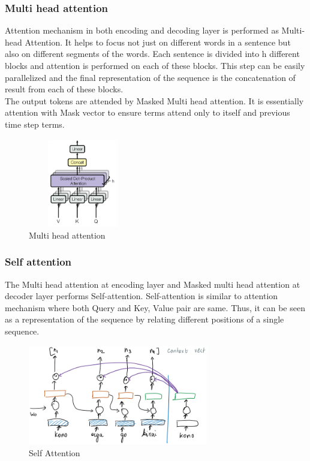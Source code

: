 \subsubsection{Multi head attention}
Attention mechanism in both encoding and decoding layer is performed as Multi-head Attention. It helps to focus not just on different words in a sentence but also on different segments of the words. Each sentence is divided into h different blocks and attention is performed on each of these blocks. This step can be easily parallelized and the final representation of the sequence is the concatenation of result from each of these blocks.  \\
The output tokens are attended by Masked Multi head attention. It is essentially attention with Mask vector to ensure terms attend only to itself and previous time step terms. 

\begin{figure}[H]
\centering
\includegraphics[width=0.4\textwidth]{images/mutlihead.png}
\caption{Multi head attention}
\label{fig:multihead}
\end{figure} 

\subsubsection{Self attention}
The Multi head attention at encoding layer and Masked multi head attention at decoder layer performs Self-attention. Self-attention is similar to attention mechanism where both Query and Key, Value pair are same. Thus, it can be seen as a representation of the sequence by relating different positions of a single sequence.
\begin{figure}[H]
\centering
\includegraphics[width=0.7\textwidth]{images/selfattn.png}
\caption{Self Attention}
\label{fig:selfattn}
\end{figure} 

